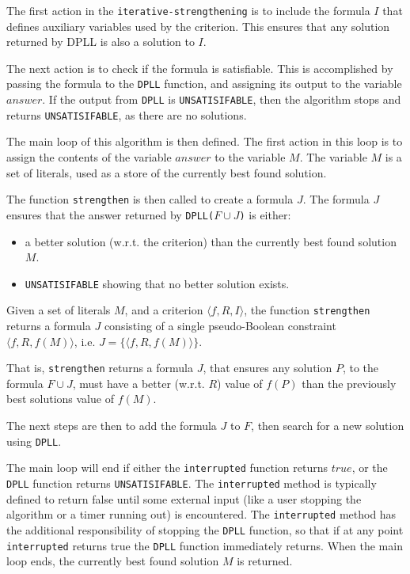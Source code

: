 The first action in the \texttt{iterative-strengthening} is to include the formula $I$ that defines auxiliary variables used by the criterion.
This ensures that any solution returned by DPLL is also a solution to $I$.

The next action is to check if the formula is satisfiable.
This is accomplished by passing the formula to the \texttt{DPLL} function, and assigning its output to the variable $answer$.
If the output from \texttt{DPLL} is \texttt{UNSATISIFABLE}, then the algorithm stops and returns \texttt{UNSATISIFABLE}, as there are no solutions.

The main loop of this algorithm is then defined.
The first action in this loop is to assign the contents of the variable $answer$ to the variable $M$.
The variable $M$ is a set of literals, used as a store of the currently best found solution.

The function \texttt{strengthen} is then called to create a formula $J$.
The formula $J$ ensures that the answer returned by \texttt{DPLL(}$F \cup J$\texttt{)} is either:
\begin{itemize}
  \item a better solution (w.r.t. the criterion) than the currently best found solution $M$. 
  \item \texttt{UNSATISIFABLE} showing that no better solution exists.
\end{itemize}

\begin{defs}
Given a set of literals $M$, and a criterion $\langle f, R, I \rangle$,
the function \texttt{strengthen} returns a formula $J$ consisting of a single pseudo-Boolean constraint $\langle f,R,f(M) \rangle$, i.e. $ J = \{ \langle f,R,f(M) \rangle \}$.
\end{defs}
That is, \texttt{strengthen} returns a formula $J$,
that ensures any solution $P$, to the formula $F \cup J$, must have a better (w.r.t. $R$) value of $f(P)$ than the previously best solutions value of $f(M)$.

The next steps are then to add the formula $J$ to $F$, then search for a new solution using \texttt{DPLL}.

The main loop will end if either the \texttt{interrupted} function returns $true$, or the \texttt{DPLL} function returns \texttt{UNSATISIFABLE}.
The \texttt{interrupted} method is typically defined to return false until some external input (like a user stopping the algorithm or a timer running out) is encountered.
The \texttt{interrupted} method has the additional responsibility of stopping the \texttt{DPLL} function, 
so that if at any point \texttt{interrupted} returns true the \texttt{DPLL} function immediately returns.
When the main loop ends, the currently best found solution $M$ is returned.

